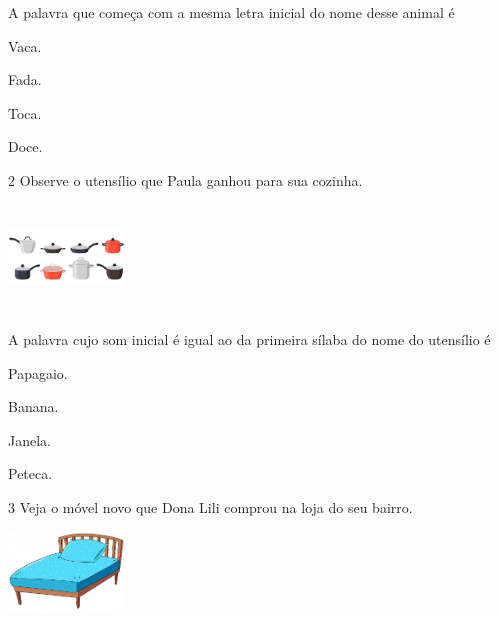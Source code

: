 
A palavra que começa com a mesma letra inicial do nome desse animal é

\begin{escolha}
\item Vaca.

\item Fada.

\item Toca.

\item Doce.
\end{escolha}

\num{2} Observe o utensílio que Paula ganhou para sua cozinha.

\includegraphics[width=1.22222in,height=1.11389in]{media/image19.jpeg}


A palavra cujo som inicial é igual ao da primeira sílaba do nome do utensílio é

\begin{escolha}
\item Papagaio.

\item Banana.

\item Janela.

\item Peteca.
\end{escolha}

\num{3} Veja o móvel novo que Dona Lili comprou na loja do seu bairro.

\includegraphics[width=1.22293in,height=0.81839in]{media/image140.jpeg}

